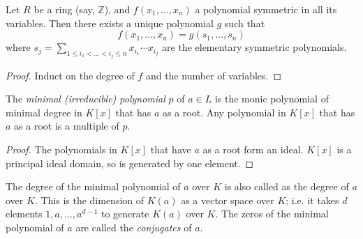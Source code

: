 \begin{thm}
Let $R$ be a ring (say, $\mathbb Z$), and $f(x_1,\ldots, x_n)$ a polynomial symmetric in all its variables. Then there exists a unique polynomial $g$ such that
\[f(x_1,\ldots, x_n)=g(s_1,\ldots, s_n)\]
where $s_j=\sum_{1\leq i_1<\ldots<i_j\leq n}x_{i_1}\cdots x_{i_j}$ are the elementary symmetric polynomials.
\end{thm}
\begin{proof}
Induct on the degree of $f$ and the number of variables.
\end{proof}

\begin{thm}
The \emph{minimal (irreducible) polynomial} $p$ of $a\in L$ is the monic polynomial of minimal degree in $K[x]$ that has $a$ as a root. Any polynomial in $K[x]$ that has $a$ as a root is a multiple of $p$.
\end{thm}
\begin{proof}
The polynomials in $K[x]$ that have $a$ as a root form an ideal. $K[x]$ is a principal ideal domain, so is generated by one element.
\end{proof}
The degree of the minimal polynomial of $a$ over $K$ is also called as the degree of $a$ over $K$. This is the dimension of $K(a)$ as a vector space over $K$; i.e. it takes $d$ elements $1,a,\ldots, a^{d-1}$ to generate $K(a)$ over $K$. The zeros of the minimal polynomial of $a$ are called the \emph{conjugates} of $a$.

